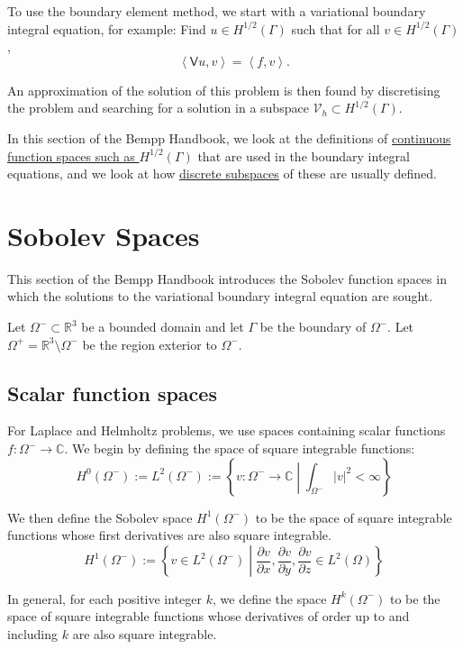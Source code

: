 \documentclass[a4paper]{book}
\begin{document}
To use the boundary element method, we start with a variational boundary integral
equation, for example: Find $u\in H^{1/2}(\Gamma)$ such that for all $v\in H^{1/2}(\Gamma)$,
\[\left\langle\mathsf{V}u,v\right\rangle = \left\langle f,v\right\rangle.\]

An approximation of the solution of this problem is then found by discretising the problem
and searching for a solution in a subspace $\mathcal{V}_h\subset H^{1/2}(\Gamma)$.

In this section of the Bempp Handbook, we look at the definitions of
\href{soboov_space.md}{continuous function spaces such as $H^{1/2}(\Gamma)$}
that are used in the boundary integral equations, and we look at how
\href{discrete_function_spaces.md}{discrete subspaces} of these are usually defined.


\section{Sobolev Spaces}


This section of the Bempp Handbook introduces the Sobolev function spaces in which the solutions
to the variational boundary integral equation are sought.

Let $\Omega^-\subset\mathbb{R}^3$ be a bounded domain and let $\Gamma$
be the boundary of $\Omega^-$. Let $\Omega^+=\mathbb{R}^3\setminus\Omega^-$ be the region exterior
to $\Omega^-$.

\subsection{ Scalar function spaces}For Laplace and Helmholtz problems, we use spaces containing scalar functions
$f:\Omega^-\to\mathbb{C}$.
We begin by defining the space of square integrable functions:
\[H^0(\Omega^-):=L^2(\Omega^-):=\left\{v:\Omega^-\to\mathbb{C}\middle|\int_{\Omega^-} |v|^2<\infty\right\}\]

We then define the Sobolev space $H^1(\Omega^-)$ to be the space of square integrable functions
whose first derivatives are also square integrable.
\[H^1(\Omega^-):=\left\{v\in L^2(\Omega^-)\middle|\frac{\partial v}{\partial x}, \frac{\partial v}{\partial y}, \frac{\partial v}{\partial z}\in L^2(\Omega)\right\}\]

In general, for each positive integer $k$, we define the space $H^k(\Omega^-)$ to be the space
of square integrable functions whose derivatives of order up to and including $k$ are also
square integrable.
\end{document}
